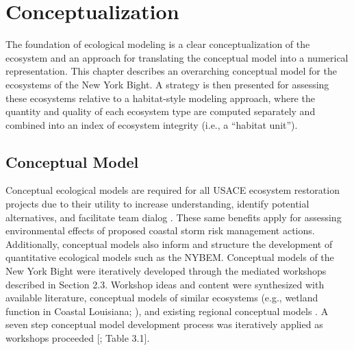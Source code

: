 \documentclass[
]{book}
\begin{document}
\hypertarget{conceptualization}{%
\chapter{Conceptualization}\label{conceptualization}}

The foundation of ecological modeling is a clear conceptualization of the ecosystem and an approach for translating the conceptual model into a numerical representation. This chapter describes an overarching conceptual model for the ecosystems of the New York Bight. A strategy is then presented for assessing these ecosystems relative to a habitat-style modeling approach, where the quantity and quality of each ecosystem type are computed separately and combined into an index of ecosystem integrity (i.e., a ``habitat unit'').

\hypertarget{conceptual-model}{%
\section{Conceptual Model}\label{conceptual-model}}

Conceptual ecological models are required for all USACE ecosystem restoration projects due to their utility to increase understanding, identify potential alternatives, and facilitate team dialog \citep{fischenich_application_2008, us_army_corps_of_engineers_assuring_2011}. These same benefits apply for assessing environmental effects of proposed coastal storm risk management actions. Additionally, conceptual models also inform and structure the development of quantitative ecological models \citep{grant_ecological_2008, swannack_ecological_2012} such as the NYBEM. Conceptual models of the New York Bight were iteratively developed through the mediated workshops described in Section 2.3. Workshop ideas and content were synthesized with available literature, conceptual models of similar ecosystems (e.g., wetland function in Coastal Louisiana; \citet{twilley_formulation_nodate}), and existing regional conceptual models \citep[e.g.,][]{montagna_conceptual_2013}. A seven step conceptual model development process was iteratively applied as workshops proceeded {[}\citet{fischenich_application_2008}; Table 3.1{]}.
\end{document}
